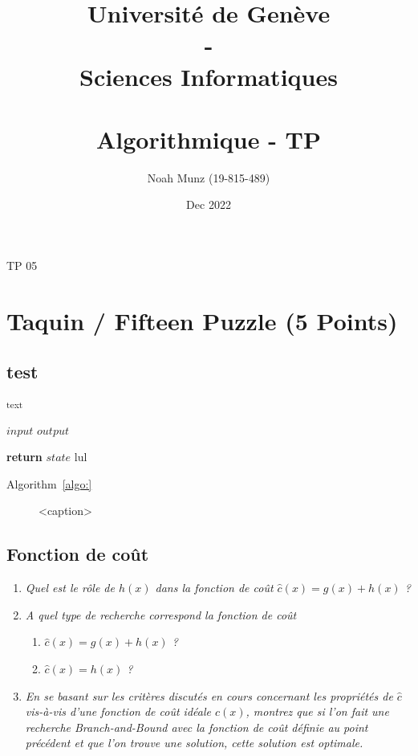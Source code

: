 \documentclass[french]{article}
\title{\vspace{-2cm}
   {\huge Université de Genève \\ - \\ Sciences Informatiques} \\
    \vspace{0.6cm}
    \unilogo{0.38} \\ 
    \vspace{1.1cm}
    {\huge Algorithmique - TP \nb}
    \vspace{0.1cm}
}
\author{Noah Munz (19-815-489)}
\date{Dec 2022}
\newcommand{\nb}{05}
\begin{document}
%
\maketitle
\vspace{0.5cm}
\tableofcontents
\thispagestyle{empty}
\clearpage
\setcounter{page}{1}
%
%
\begin{center}
	{\huge TP \nb}
\end{center}
\vspace{0.3cm}
%
\section{Taquin / Fifteen Puzzle (5 Points)}

\subsection{test}

\textsubscript{text}
\begin{algorithm}
	\algrenewcommand{}
	\algrenewcommand{}
	\caption{}
	\label{algo:}
	\begin{algorithmic}[1]
		\Require $input$
		\Ensure $output$
		
		\State \textbf{return} $state$
		\State lul
	\end{algorithmic}
\end{algorithm}


Algorithm~\ref{algo:}

\begin{figure}[htbp]
	\centering
	
	\caption{<caption>}
	\label{<label>}
\end{figure}


\subsection{Fonction de coût}
\vspace{0.4cm}


\begin{enumerate}[label=(\alph*)]
	\item \textit{Quel est le rôle de $h(x)$ dans la fonction de coût $\hat{c}(x) = g(x) + h(x)$ ?}
	\item \textit{A quel type de recherche correspond la fonction de coût}
	\begin{enumerate}[label=\arabic*)]
		\item \textit{$\hat{c}(x) = g(x) + h(x)$ ?}
		\item \textit{$\hat{c}(x) = h(x)$ ?}
	\end{enumerate}
	\item  \textit{En se basant sur les critères discutés en cours concernant les propriétés de $\hat{c}$
	vis-à-vis d'une fonction de coût idéale $c(x)$, montrez que si l'on fait une recherche Branch-and-Bound 
	avec la fonction de coût définie au point précédent et que l'on trouve une solution, cette solution est optimale.}\\
\end{enumerate}
\end{document}
